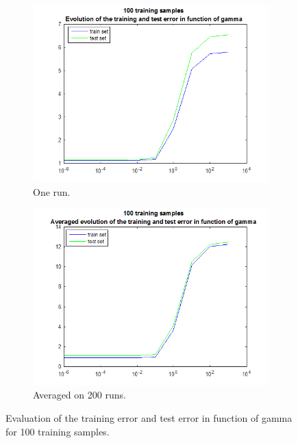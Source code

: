 \documentclass{article} %
\begin{document}
 \begin{figure}[h]
\center
 \begin{subfigure}[b]{0.45\textwidth}
        \includegraphics[width=\textwidth]{4_100}
        \caption{One run.}
    \end{subfigure}
    \begin{subfigure}[b]{0.45\textwidth}
        \includegraphics[width=\textwidth]{4_100_avg}
        \caption{Averaged on 200 runs.}
    \end{subfigure}
    \caption{Evaluation of the training error and test error in function of gamma for 100 training samples.}
    \label{fig:ex4_100}
\end{figure}
\end{document}
